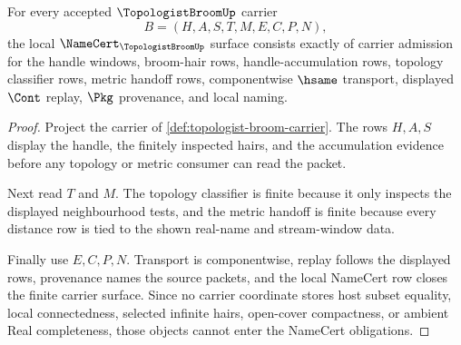 \begin{theorem}
\label{thm:topologist-broom-namecert-obligations}
For every accepted $\TopologistBroomUp$ carrier
$$
B=(H,A,S,T,M,E,C,P,N),
$$
the local $\NameCert_{\TopologistBroomUp}$ surface consists exactly of carrier admission for the handle windows, broom-hair rows, handle-accumulation rows, topology classifier rows, metric handoff rows, componentwise $\hsame$ transport, displayed $\Cont$ replay, $\Pkg$ provenance, and local naming.
\end{theorem}
\begin{proof}
Project the carrier of \autoref{def:topologist-broom-carrier}. The rows $H,A,S$ display the handle, the finitely inspected hairs, and the accumulation evidence before any topology or metric consumer can read the packet.

Next read $T$ and $M$. The topology classifier is finite because it only inspects the displayed neighbourhood tests, and the metric handoff is finite because every distance row is tied to the shown real-name and stream-window data.

Finally use $E,C,P,N$. Transport is componentwise, replay follows the displayed rows, provenance names the source packets, and the local NameCert row closes the finite carrier surface. Since no carrier coordinate stores host subset equality, local connectedness, selected infinite hairs, open-cover compactness, or ambient Real completeness, those objects cannot enter the NameCert obligations.
\end{proof}

